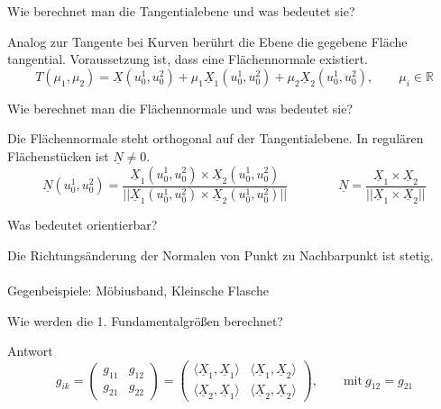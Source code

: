 \documentclass[twocolumn, fontsize=8pt, DIV=1]{scrartcl}
\begin{document}
\begin{framed}
    Wie berechnet man die Tangentialebene und was bedeutet sie?
\end{framed}
Analog zur Tangente bei Kurven berührt die Ebene die gegebene Fläche tangential. Voraussetzung ist, dass eine Flächennormale existiert.
\[
    T(\mu_1, \mu_2) = \underline{X}(u^1_0, u^2_0) + \mu_1 \underline{X}_1(u^1_0, u^2_0) + \mu_2 \underline{X}_2(u^1_0, u^2_0),
    \qquad \mu_i \in \mathbb{R}
\]


\begin{framed}
    Wie berechnet man die Flächennormale und was bedeutet sie?
\end{framed}
Die Flächennormale steht orthogonal auf der Tangentialebene. In regulären Flächenstücken ist $\underline{N} \neq 0$.
\[
    \underline{N}(u^1_0, u^2_0) = \frac{\underline{X}_1(u^1_0, u^2_0) \times \underline{X}_2(u^1_0, u^2_0)}{||\underline{X}_1(u^1_0, u^2_0) \times \underline{X}_2(u^1_0, u^2_0)||}
    \qquad \qquad
    \underline{N} = \frac{\underline{X}_1 \times \underline{X}_2}{||\underline{X}_1 \times \underline{X}_2||}
\]


\begin{framed}
    Was bedeutet orientierbar?
\end{framed}
Die Richtungsänderung der Normalen von Punkt zu Nachbarpunkt ist stetig.\\
\\
Gegenbeispiele: Möbiusband, Kleinsche Flasche



\begin{framed}
    Wie werden die 1. Fundamentalgrößen berechnet?
\end{framed}
Antwort
\[
    g_{ik} =
        \left(
            \begin{array}{rr}
                g_{11} & g_{12} \\
                g_{21} & g_{22}
            \end{array}
        \right) =
        \left(
            \begin{array}{rr}
                \langle \underline{X}_1, \underline{X}_1 \rangle & \langle \underline{X}_1, \underline{X}_2 \rangle \\
                \langle \underline{X}_2, \underline{X}_1 \rangle & \langle \underline{X}_2, \underline{X}_2 \rangle
            \end{array}
        \right)
        , \qquad \text{mit}\ g_{12} = g_{21}
\]
\end{document}
